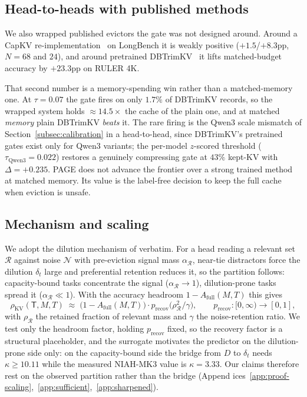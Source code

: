\documentclass{article}
\newcommand{\method}{PAGE\xspace}
\begin{document}
\subsection{Head-to-heads with published methods}
\label{subsec:headtohead}\label{subsec:capkv-longbench}\label{subsec:dbtrimkv}

We also wrapped published evictors the gate was not designed around. Around a
CapKV re-implementation~\citep{arxiv260425975} on LongBench it is weakly
positive ($+1.5$/$+8.3$pp, $N = 68$ and $24$), and around pretrained
DBTrimKV~\citep{arxiv260509649} it lifts matched-budget accuracy by $+23.3$pp
on RULER 4K.

That second number is a memory-spending win rather than a matched-memory one.
At $\tau = 0.07$ the gate fires on only $1.7\%$ of DBTrimKV records, so the
wrapped system holds $\approx 14.5\times$ the cache of the plain one, and at
matched \emph{memory} plain DBTrimKV \emph{beats} it. The rare firing is the
Qwen3 scale mismatch of Section~\ref{subsec:calibration} in a head-to-head,
since DBTrimKV's pretrained gates exist only for Qwen3 variants; the per-model
$z$-scored threshold ($\tau_{\mathrm{Qwen3}} = 0.022$) restores a genuinely
compressing gate at $43\%$ kept-KV with $\Delta = +0.235$. \method does not
advance the frontier over a strong trained method at matched memory. Its value
is the label-free decision to keep the full cache when eviction is unsafe.

\subsection{Mechanism and scaling}
\label{subsec:theory}\label{sec:theory}

We adopt the dilution mechanism of \citet{arxiv260509649} verbatim. For a head
reading a relevant set $\mathcal{R}$ against noise $\mathcal{N}$ with
pre-eviction signal mass $\alpha_{\mathcal{R}}$, near-tie distractors force
the dilution $\delta_t$ large and preferential retention reduces it, so the
partition follows: capacity-bound tasks concentrate the signal
($\alpha_{\mathcal{R}} \to 1$), dilution-prone tasks spread it
($\alpha_{\mathcal{R}} \ll 1$). With the accuracy headroom $1 -
A_{\mathrm{full}}(M, T)$ this gives
\begin{equation}
\label{eq:scaling}
\rho_{\mathrm{KV}}(\mathsf{T}, M, T) \;\approx\;
\bigl(1 - A_{\mathrm{full}}(M, T)\bigr) \cdot p_{\mathrm{recov}}\bigl(\rho_{\mathcal{R}}^2 / \gamma\bigr),
\qquad p_{\mathrm{recov}}: [0, \infty) \to [0, 1],
\end{equation}
with $\rho_{\mathcal{R}}$ the retained fraction of relevant mass and $\gamma$
the noise-retention ratio. We test only the headroom factor, holding
$p_{\mathrm{recov}}$ fixed, so the recovery factor is a structural
placeholder, and the surrogate motivates the predictor on the dilution-prone
side only: on the capacity-bound side the bridge from $D$ to $\delta_t$ needs
$\kappa \ge 10.11$ while the measured NIAH-MK3 value is $\kappa = 3.33$. Our
claims therefore rest on the observed partition rather than the bridge (Append
ices~\ref{app:proof-scaling},~\ref{app:sufficient},~\ref{app:sharpened}).
\end{document}
